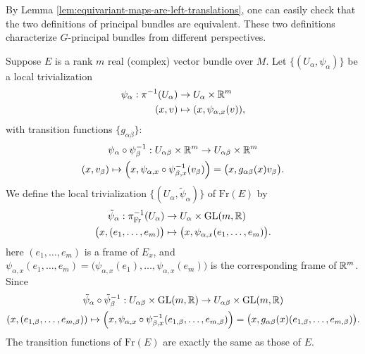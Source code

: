 \begin{remark}
    By Lemma \ref{lem:equivariant-maps-are-left-translations}, 
    one can easily check that the two definitions of principal bundles are equivalent. 
    These two definitions characterize $G$-principal bundles from different perspectives.
\end{remark}
\begin{example}
    Suppose $E$ is a rank $m$ real (complex) vector bundle over $M$.
    Let $\{(U_\alpha, \psi_\alpha)\}$ be a local trivialization 
    \begin{align*}
        \psi_\alpha: \pi^{-1}(U_\alpha)&\to U_\alpha\times \mathbb{R}^m \\ 
        (x,v) &\mapsto (x, \psi_{\alpha,x}(v)),
    \end{align*}
    with transition functions $\{g_{\alpha\beta}\}$:
    \begin{gather*}
        \psi_\alpha\circ\psi_\beta^{-1}: U_{\alpha\beta}\times \mathbb{R}^m \to U_{\alpha\beta}\times \mathbb{R}^m \\
        (x,v_\beta) \mapsto \Big(x,\psi_{\alpha,x}\circ\psi_{\beta,x}^{-1}(v_\beta)\Big) = \big(x, g_{\alpha\beta}(x)v_\beta\big).
    \end{gather*}
    We define the local trivialization $\{(U_\alpha, \tilde{\psi}_\alpha)\}$ of $\mathrm{Fr}(E)$ by 
    \begin{align*}
        \tilde{\psi}_\alpha: \pi_{\mathrm{Fr}}^{-1}(U_\alpha)&\to U_\alpha\times {\rm GL}(m,\mathbb{R}) \\ 
        \big(x, (e_1, \ldots, e_m)\big) &\mapsto \big(x, \psi_{\alpha,x}(e_1, \ldots, e_m)\big).
    \end{align*}
    here $(e_1, \ldots, e_m)$ is a frame of $E_x$, 
    and $\psi_{\alpha,x}(e_1, \ldots, e_m) = \big(\psi_{\alpha,x}(e_1), \ldots, \psi_{\alpha,x}(e_m)\big)$ 
    is the corresponding frame of $\mathbb{R}^m$. Since
    \begin{gather*}
        \tilde{\psi}_\alpha\circ\tilde{\psi}_\beta^{-1}: U_{\alpha\beta}\times {\rm GL}(m,\mathbb{R}) \to U_{\alpha\beta}\times {\rm GL}(m,\mathbb{R}) \\
        (x, (e_{1,\beta}, \ldots, e_{m,\beta})) \mapsto 
        \Big(x, \psi_{\alpha,x}\circ\psi_{\beta,x}^{-1}(e_{1,\beta}, \ldots, e_{m,\beta})\Big) 
        = \big(x, g_{\alpha\beta}(x)(e_{1,\beta}, \ldots, e_{m,\beta})\big).
    \end{gather*}
    The transition functions of $\mathrm{Fr}(E)$ are exactly the same as those of $E$. 
\end{example}

